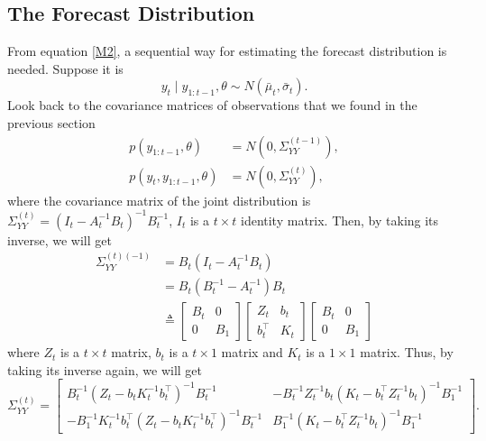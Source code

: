 \subsection{The Forecast Distribution}\label{sectionforecast}

From equation \eqref{M2}, a sequential way for estimating the forecast distribution is needed. Suppose it is 
\begin{equation}
y_{t}\mid y_{1:t-1},\theta \sim N\left( \bar{\mu}_{t},\bar{\sigma}_{t} \right). 
\end{equation}
Look back to the covariance matrices of observations that we found in the previous section 
\begin{equation}
\begin{split}
p(y_{1:t-1},\theta) &= N\left( 0,\Sigma_{YY}^{(t-1)} \right),\\
p(y_{t},y_{1:t-1},\theta) &= N\left( 0,\Sigma_{YY}^{(t)} \right),
\end{split}
\end{equation}
where the covariance matrix of the joint distribution is $\Sigma_{YY}^{(t)} = (I_{t}-A_{t}^{-1}B_{t})^{-1}B_{t}^{-1}$, $I_t$ is a $t\times t$ identity matrix. Then, by taking its inverse, we will get 
\begin{equation}
\begin{split}
\Sigma_{YY}^{(t) (-1)} &= B_{t}(I_{t}-A_{t}^{-1}B_{t}) \\
&= B_{t}(B_{t}^{-1}-A_{t}^{-1})B_{t} \\
&\triangleq \begin{bmatrix} 
B_t & 0 \\ 0 & B_1 \end{bmatrix}
\begin{bmatrix} 
Z_{t} & b_{t} \\
b_{t}^\top & K_{t}
\end{bmatrix} \begin{bmatrix} 
B_t & 0 \\ 0 & B_1\end{bmatrix}
\end{split}
\end{equation}
where $Z_{t}$ is a $t \times t$ matrix, $ b_{t} $ is a $t \times 1$ matrix and $K_{t}$ is a $1 \times 1$ matrix. Thus, by taking its inverse again, we will get 
\begin{equation} \Sigma_{YY}^{(t)}= \left[ \begin{matrix}
B_t^{-1} \left(Z_{t}-b_{t}K_{t}^{-1}b_{t}^\top\right)^{-1}B_t^{-1}  & - B_t^{-1}  Z_{t}^{-1}b_{t}\left(K_{t}-b_{t}^\top Z_{t}^{-1}b_{t}\right)^{-1}B_1^{-1} \\
-B_1^{-1}  K_{t}^{-1}b_{t}^\top \left(Z_{t}-b_{t}K_{t}^{-1}b_{t}^\top\right)^{-1}B_t^{-1}  & B_1^{-1}  \left(K_{t}-b_{t}^\top Z_{t}^{-1}b_{t}\right)^{-1}B_1^{-1} 
\end{matrix}\right].
\end{equation}
